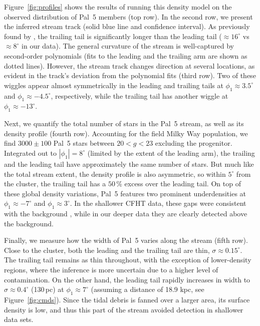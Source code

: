 \documentclass[twocolumn]{aastex62}
\begin{document}
Figure~\ref{fig:profiles} shows the results of running this density model on the observed distribution of Pal~5 members (top row).
In the second row, we present the inferred stream track (solid blue line and confidence interval).
As previously found by \citet{Bernard:2016}, the trailing tail is significantly longer than the leading tail ($\approx16^\circ$ vs $\approx8^\circ$ in our data).
The general curvature of the stream is well-captured by second-order polynomials (fits to the leading and the trailing arm are shown as dotted lines).
However, the stream track changes direction at several locations, as evident in the track's deviation from the polynomial fits (third row).
Two of these wiggles appear almost symmetrically in the leading and trailing tails at $\phi_1\approx3.5^\circ$ and $\phi_1\approx-4.5^\circ$, respectively, while the trailing tail has another wiggle at $\phi_1\approx-13^\circ$.

Next, we quantify the total number of stars in the Pal~5 stream, as well as its density profile (fourth row).
Accounting for the field Milky Way population, we find $3000\pm100$ Pal~5 stars between $20<g<23$ excluding the progenitor.
Integrated out to $|\phi_1|=8^\circ$ (limited by the extent of the leading arm), the trailing and the leading tail have approximately the same number of stars.
But much like the total stream extent, the density profile is also asymmetric, so within $5^\circ$ from the cluster, the trailing tail has a $50\,\%$ excess over the leading tail.
On top of these global density variations, Pal~5 features two prominent underdensities at $\phi_1\approx-7^\circ$ and $\phi_1\approx3^\circ$.
In the shallower CFHT data, these gaps were consistent with the background \citep{Erkal:2016}, while in our deeper data they are clearly detected above the background.

Finally, we measure how the width of Pal~5 varies along the stream (fifth row).
Close to the cluster, both the leading and the trailing tail are thin, $\sigma\approx0.15^\circ$.
The trailing tail remains as thin throughout, with the exception of lower-density regions, where the inference is more uncertain due to a higher level of contamination.
On the other hand, the leading tail rapidly increases in width to $\sigma\approx0.4^\circ$ (130\,pc) at $\phi_1\approx7^\circ$ (assuming a distance of 18.9 kpc, see Figure~\ref{fig:cmds}).
Since the tidal debris is fanned over a larger area, its surface density is low, and thus this part of the stream avoided detection in shallower data sets.
\end{document}
